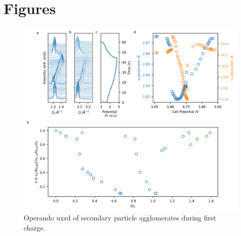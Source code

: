 \documentclass{article}
\begin{document}

\section*{Figures}

\begin{figure}
  \includegraphics{figures/NCA_xrd.png}
  \caption{Operando \gls{uxrd} of \nca{} secondary particle
    agglomerates during first charge. }
  \label{fig:uxrd}
\end{figure}
\end{document}
